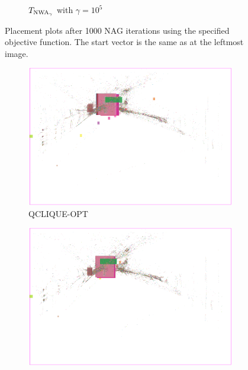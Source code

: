 \begin{figure}
\begin{subfigure}{.32\textwidth}
  \caption{\(T_{\operatorname{NWA}_\gamma}\) with \(\gamma = 10^5\)}
 \end{subfigure}

 \caption{Placement plots after 1000 NAG iterations using the specified objective function.
          The start vector is the same as at the leftmost image.}
 \label{fig:start_vectors_placement_plots}
\end{figure}
\begin{figure}\ContinuedFloat
 \centering
 \begin{subfigure}{.32\textwidth}
  \includegraphics[width=\textwidth]{start_vectors/convergence_Chip1_qp.png}  
  \caption{QCLIQUE-OPT}
 \end{subfigure}
 \hfill
 \begin{subfigure}{.32\textwidth}
  \includegraphics[width=\textwidth]{start_vectors/convergence_Chip1_LSE_qp_100000_gamma.png}  

\end{subfigure}
\end{figure}
